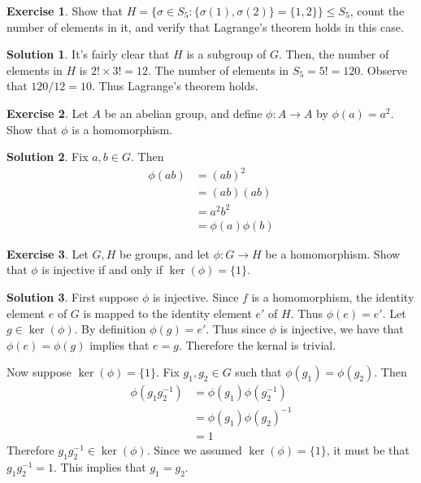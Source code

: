 \documentclass[12pt]{article}
\theoremstyle{definition}
\newtheorem{exercise}{Exercise}
\theoremstyle{definition}
\newtheorem{solution}{Solution}
\begin{document}
\begin{exercise}
Show that $H = \{\sigma \in S_5 : \{\sigma(1), \sigma(2) \} = \{1,2\} \} \leq S_5$, count the number of elements in it, and verify that Lagrange's theorem holds in this case.
\end{exercise}
\begin{solution}
It's fairly clear that $H$ is a subgroup of $G$. Then, the number of elements in $H$ is $2! \times 3! = 12$. The number of elements in $S_5 = 5! = 120$. Observe that $120 / 12 = 10$. Thus Lagrange's theorem holds. 
\end{solution}

\begin{exercise}
Let $A$ be an abelian group, and define $\phi : A \to A$ by $\phi(a) = a^2$. Show that $\phi$ is a homomorphism. 
\end{exercise}
\begin{solution}
Fix $a,b \in G$. Then
\begin{align*}
\phi(ab) &= (ab)^2 \\
&= (ab) (ab) \\
&= a^2 b^2 \tag{since $A$ is abelian} \\
&= \phi(a) \phi(b)
\end{align*}
\end{solution}

\begin{exercise}
Let $G, H$ be groups, and let $\phi : G \to H$ be a homomorphism. Show that $\phi$ is injective if and only if $\ker(\phi) = \{1\}$.
\end{exercise}
\begin{solution}
First suppose $\phi$ is injective. Since $f$ is a homomorphism, the identity element $e$ of $G$ is mapped to the identity element $e'$ of $H$. Thus $\phi(e) = e'$. Let $g \in \ker(\phi)$. By definition $\phi(g) = e'$. Thus since $\phi$ is injective, we have that $\phi(e) = \phi(g)$ implies that $e = g$. Therefore the kernal is trivial.

Now suppose $\ker(\phi) = \{1\}$. Fix $g_1, g_2 \in G$ such that $\phi(g_1) = \phi(g_2)$. Then
\begin{align*}
\phi(g_1 g_2^{-1}) &= \phi(g_1) \phi(g_2^{-1}) \tag{$\phi$ is a homomorphism}\\
&= \phi(g_1) \phi(g_2)^{-1} \tag{property of homomorphism} \\
&= 1
\end{align*} 
Therefore $g_1 g_2^{-1} \in \ker(\phi)$. Since we assumed $\ker(\phi) = \{1\}$, it must be that $g_1 g_2^{-1} = 1$. This implies that $g_1 = g_2$.
\end{solution}
\end{document}
